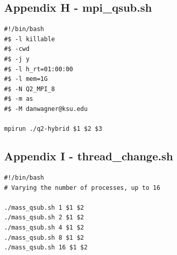 \documentclass[notitlepage, letterpaper, 12pt]{report}
\begin{document}
\subsection*{Appendix H - mpi\_qsub.sh}
\begin{lstlisting}
#!/bin/bash
#$ -l killable
#$ -cwd
#$ -j y
#$ -l h_rt=01:00:00
#$ -l mem=1G
#$ -N Q2_MPI_8
#$ -m as
#$ -M danwagner@ksu.edu

mpirun ./q2-hybrid $1 $2 $3
\end{lstlisting}
\subsection*{Appendix I - thread\_change.sh}
\begin{lstlisting}
#!/bin/bash
# Varying the number of processes, up to 16

./mass_qsub.sh 1 $1 $2
./mass_qsub.sh 2 $1 $2 
./mass_qsub.sh 4 $1 $2 
./mass_qsub.sh 8 $1 $2 
./mass_qsub.sh 16 $1 $2
\end{lstlisting}
\end{document}
